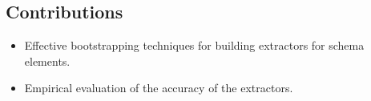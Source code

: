 \subsection{Contributions}
\begin{itemize}[noitemsep,nolistsep]
\item Effective bootstrapping techniques for building extractors for schema elements.
\item Empirical evaluation of the accuracy of the extractors. 
\end{itemize}









